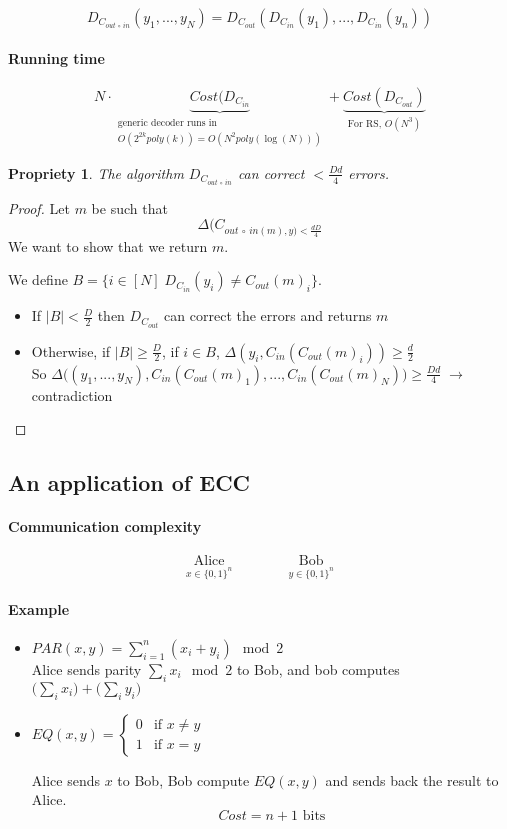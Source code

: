 \documentclass{article}
\newtheorem{prop}{Propriety}
\begin{document}
\[D_{C_{out\,\circ\, in}}(y_1,...,y_N)=D_{C_{out}}(D_{C_{in}}(y_1),...,D_{C_{in}}(y_n))\]


\paragraph{Running time}
\[N\cdot \underbrace{Cost(D_{C_{in}}}_{\substack{\text{generic decoder runs in}\\ O(2^{2k}poly(k))=O(N^2poly(\log(N)))}} + \underbrace{Cost(D_{C_{out}})}_{\text{For RS, } O(N^3)} \]

\begin{prop}
The algorithm $D_{C_{out \,\circ\, in}}$ can correct $<\frac{Dd}{4}$ errors.
\end{prop}
\begin{proof}
Let $m$ be such that 
\[\Delta( C_{out \,\circ \, in (m),y) < \frac{dD}{4}}\]
We want to show that we return $m$.

We define $B=\{i\in [N] \; D_{C_{in}}(y_i) \neq C_{out}(m)_i\}$.

\begin{itemize}
\item If $|B|<\frac{D}{2}$ then $D_{C_{out}}$ can correct the errors and returns $m$
\item Otherwise, if $|B|\geq \frac{D}{2}$, if $i\in B$, $\Delta(y_i,C_{in}(C_{out}(m)_i))\geq \frac{d}{2}$\\
So $\Delta \Big( (y_1,...,y_N),C_{in}(C_{out}(m)_1),...,C_{in}(C_{out}(m)_N) \Big) \geq \frac{Dd}{4} \; \to \; $ contradiction
\end{itemize}
\end{proof}


\subsection{An application of ECC}

\paragraph{Communication complexity}
\[\underset{x\in \{0,1\}^n}{\text{Alice}} \qquad \qquad \underset{y\in \{0,1\}^n}{\text{Bob}} \]

\paragraph{Example}
\begin{itemize}
\item $PAR(x,y)=\sum_{i=1}^n (x_i+y_i) \mod 2$\\
Alice sends parity $\sum_i x_i \mod 2$ to Bob, and bob computes $\Big( \sum_i x_i \Big) + \Big( \sum_i y_i \Big)$
\item $EQ(x,y)=
\begin{cases}
0 & \text{if } x\neq y\\
1 & \text{if } x= y
\end{cases}$

Alice sends $x$ to Bob, Bob compute $EQ(x,y)$ and sends back the result to Alice.
\[Cost = n+1 \text{ bits}\]
\end{itemize}
\end{document}
